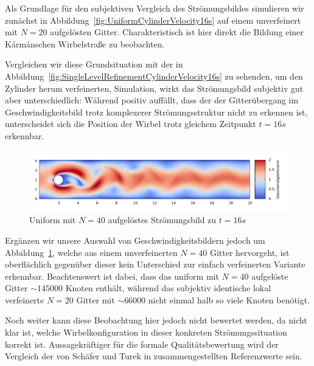Als Grundlage für den subjektiven Vergleich des Strömungsbildes simulieren wir zunächst in Abbildung~\ref{fig:UniformCylinderVelocity16s} auf einem unverfeinert mit \(N=20\) aufgelösten Gitter. Charakteristisch ist hier direkt die Bildung einer Kármánschen Wirbelstraße zu beobachten.

\noindent
Vergleichen wir diese Grundsituation mit der in Abbildung~\ref{fig:SingleLevelRefinementCylinderVelocity16s} zu sehenden, um den Zylinder herum verfeinerten, Simulation, wirkt das Strömungsbild subjektiv gut aber unterschiedlich: Während positiv auffällt, dass der der Gitterübergang im Geschwindigkeitsbild trotz komplexerer Strömungsstruktur nicht zu erkennen ist, unterscheidet sich die Position der Wirbel trotz gleichem Zeitpunkt \(t=16s\) erkennbar.

\begin{figure}[H]
\begin{adjustbox}{center}
\includegraphics[width=1.2\textwidth]{img/static/cylinder2d_unrefined_n40_re100_16s.pdf}
\end{adjustbox}
\caption{Uniform mit \(N=40\) aufgelöstes Strömungsbild zu \(t=16s\)}
\label{fig:UniformCylinderVelocityN4016s}
\end{figure}

Ergänzen wir unsere Auswahl von Geschwindigkeitsbildern jedoch um Abbildung~\ref{fig:UniformCylinderVelocityN4016s}, welche aus einem unverfeinerten \(N=40\) Gitter hervorgeht, ist oberflächlich gegenüber dieser kein Unterschied zur einfach verfeinerten Variante erkennbar. Beachtenswert ist dabei, dass das uniform mit \(N=40\) aufgelöste Gitter \(\sim 145000\) Knoten enthält, während das subjektiv identische lokal verfeinerte \(N=20\) Gitter mit \(\sim 66000\) nicht einmal halb so viele Knoten benötigt.

\bigskip

Noch weiter kann diese Beobachtung hier jedoch nicht bewertet werden, da nicht klar ist, welche Wirbelkonfiguration in dieser konkreten Strömungssituation korrekt ist. Aussagekräftiger für die formale Qualitätsbewertung wird der Vergleich der von Schäfer und Turek in \cite{SchaeferTurek96} zusammengestellten Referenzwerte sein.

